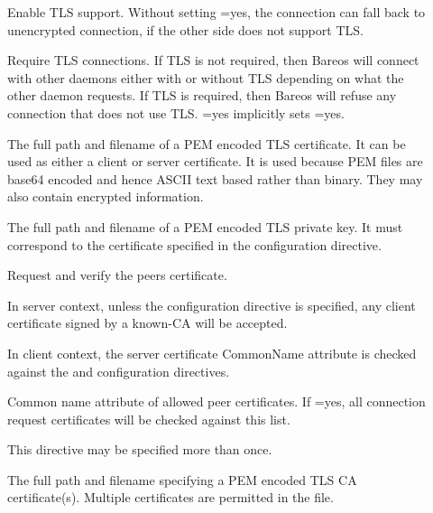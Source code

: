 \begin{description}
\item []%
Enable TLS support. Without setting =yes,
the connection can fall back to unencrypted connection,
if the other side does not support TLS.

\item []%
Require TLS connections.
If TLS is not required,
then Bareos will connect with other daemons either with or without TLS depending
on what the other daemon requests.
If TLS is required,
then Bareos will refuse any connection that does not use TLS.
=yes  implicitly sets =yes.

\item []%
The full path and filename of a PEM encoded TLS certificate.  It can be
used as either a client or server certificate.
It is used because PEM files are base64 encoded and hence ASCII
text based rather than binary.
They may also contain encrypted information.

\item []%
The full path and filename of a PEM encoded TLS private key.  It must
correspond to the certificate specified in the  configuration directive.

\item []%
Request and verify the peers certificate.

In server context, unless the  configuration directive is specified,
any client certificate signed by a known-CA will be accepted.

In client context, the server certificate CommonName attribute is checked against
the  and  configuration directives.


\item []%
Common name attribute of allowed peer certificates.
If =yes, all connection request certificates
will be checked against this list.

This directive may be specified more than once.


\item []%
The full path and filename specifying a
PEM encoded TLS CA certificate(s).  Multiple certificates are
permitted in the file.


\end{description}
